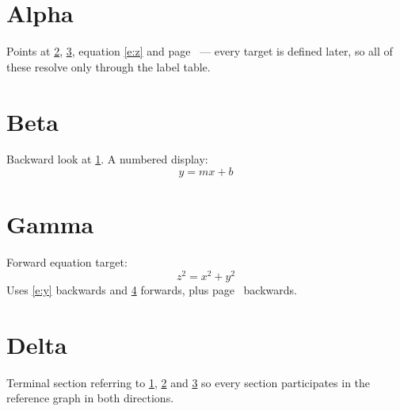 \documentclass[11pt,a4paper]{article}
\begin{document}
\tableofcontents

\section{Alpha}\label{s:a}
Points at \ref{s:b}, \ref{s:c}, equation \eqref{e:z} and
page~\pageref{s:c} — every target is defined later, so all of these
resolve only through the label table.

\section{Beta}\label{s:b}
Backward look at \ref{s:a}. A numbered display:
\begin{equation}\label{e:y}
  y = mx + b
\end{equation}

\section{Gamma}\label{s:c}
Forward equation target:
\begin{equation}\label{e:z}
  z^2 = x^2 + y^2
\end{equation}
Uses \eqref{e:y} backwards and \ref{s:d} forwards, plus
page~\pageref{s:a} backwards.

\section{Delta}\label{s:d}
Terminal section referring to \ref{s:a}, \ref{s:b} and \ref{s:c} so every
section participates in the reference graph in both directions.
\end{document}

